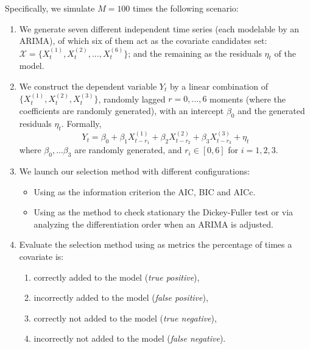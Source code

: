 \documentclass[twoside]{article}
\begin{document}
Specifically, we simulate $M=100$ times the following scenario: 
\begin{enumerate}
    \item We generate seven different independent time series (each modelable by an ARIMA), of which six of them act as the covariate candidates set: $\mathcal{X} = \{ X_t^{(1)}, X_t^{(2)}, ..., X_t^{(6)} \}$; and the remaining as the residuals $\eta_t$ of the model.
    \item We construct the dependent variable $Y_t$ by a linear combination of $\{ X_t^{(1)}, X_t^{(2)}, X_t^{(3)} \}$, randomly lagged $r=0,...,6$ moments  (where the coefficients are randomly generated), with an intercept $\beta_0$ and the generated residuals $\eta_t$. Formally,
    \[ Y_t = \beta_0  + \beta_1 X_{t-r_1}^{(1)} + \beta_2 X_{t-r_2}^{(2)} + \beta_3 X_{t-r_3}^{(3)} + \eta_t \]
    where $\beta_0,... \beta_3$ are randomly generated, and $r_i \in [0, 6]$ for $i=1,2,3$.
    \item We launch our selection method with different configurations:
    \begin{itemize}
        \item Using as the information criterion the AIC, BIC and AICc.
        \item Using as the method to check stationary the Dickey-Fuller test or via analyzing the differentiation order when an ARIMA is adjusted.
    \end{itemize}
    \item Evaluate the selection method using as metrics the percentage of times a covariate is:
    \begin{enumerate}
        \item correctly added to the model (\textit{true positive}),
        \item incorrectly added to the model (\textit{false positive}),
        \item correctly not added to the model (\textit{true negative}),
        \item incorrectly not added to the model (\textit{false negative}).
    \end{enumerate}
\end{enumerate}
\end{document}
